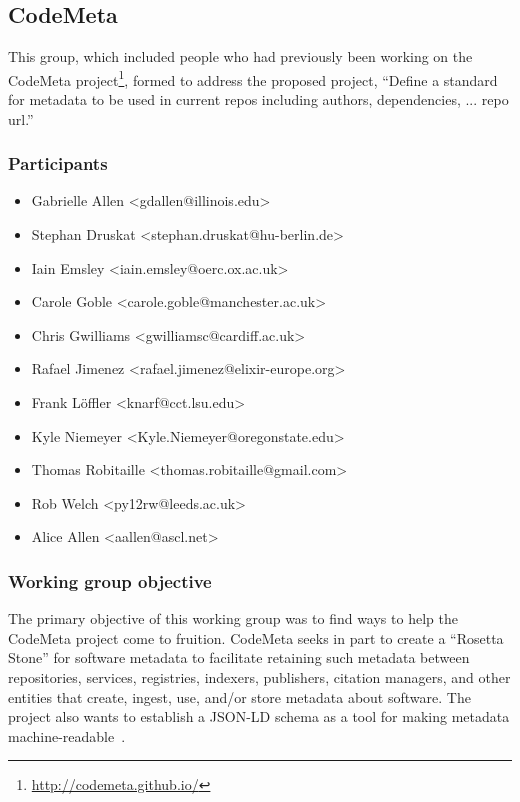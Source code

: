 \subsection{CodeMeta}
\label{sec:CodeMeta}


This group, which included people who had previously been working on the CodeMeta project\footnote{\url{http://codemeta.github.io/}}, formed to address the proposed project,
 ``Define a standard for metadata to be used in current repos including authors, dependencies, ... repo url.''

\subsubsection{Participants}

\begin{itemize}
\item Gabrielle Allen <gdallen@illinois.edu>
\item Stephan Druskat <stephan.druskat@hu-berlin.de>
\item Iain Emsley <iain.emsley@oerc.ox.ac.uk>
\item Carole Goble <carole.goble@manchester.ac.uk>
\item Chris Gwilliams <gwilliamsc@cardiff.ac.uk>
\item Rafael Jimenez <rafael.jimenez@elixir-europe.org>
\item Frank L\"{o}ffler <knarf@cct.lsu.edu>
\item Kyle Niemeyer <Kyle.Niemeyer@oregonstate.edu>
\item Thomas Robitaille <thomas.robitaille@gmail.com>
\item Rob Welch <py12rw@leeds.ac.uk>
\item Alice Allen <aallen@ascl.net>
\end{itemize}

\subsubsection{Working group objective}

The primary objective of this working group was to find ways to help the CodeMeta project come to fruition. CodeMeta seeks in part to create a ``Rosetta Stone'' for software metadata to facilitate retaining such metadata between repositories, services, registries, indexers, publishers, citation managers, and other entities that create, ingest, use, and/or store metadata about software. The project also wants to establish a JSON-LD schema as a tool for making metadata machine-readable~\cite{CodeMeta_schema}.

